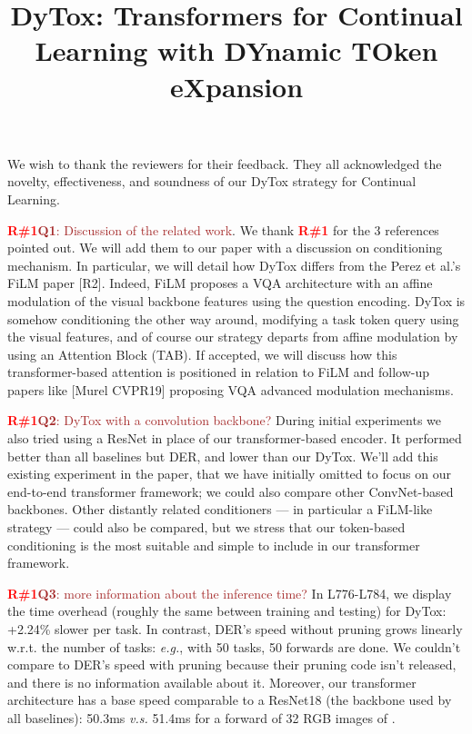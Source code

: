 \documentclass[rebuttal]{cvpr}
\newcommand{\rone}{\textcolor{red}{\textbf{R\#1}}\xspace}
\begin{document}
\title{DyTox: Transformers for Continual Learning with DYnamic TOken eXpansion}  

\maketitle
\thispagestyle{empty}


\noindent We wish to thank the reviewers for their feedback. They all acknowledged the novelty, effectiveness, and soundness of our DyTox strategy for Continual Learning.




\textcolor{brown}{\rone\textbf{Q1}: Discussion of the related work}. We thank \rone for the 3 references  pointed out. We will add them to our paper with a discussion on conditioning mechanism. 
In particular, we will detail how DyTox differs from the Perez et al.'s FiLM paper [R2]. Indeed, FiLM proposes a VQA architecture with an affine modulation of the visual backbone features using the question encoding. DyTox is somehow conditioning the other way around, modifying a task token query using the visual features, and of course our strategy departs from affine modulation by using an Attention Block (TAB). If accepted, we will discuss how this transformer-based attention is positioned in relation to FiLM and follow-up papers like [Murel CVPR19] proposing VQA advanced modulation mechanisms.  





\rone\textcolor{brown}{\textbf{Q2}: DyTox with a convolution backbone?} During initial experiments we also tried using a ResNet in place of our transformer-based encoder. It performed better than all baselines but DER, and lower than our DyTox.
We'll add this existing experiment in the paper, that we have initially omitted to focus on our end-to-end transformer framework; we could also compare other ConvNet-based backbones. Other distantly related conditioners --- in particular a FiLM-like strategy --- could also be compared, but we stress that our token-based conditioning is the most suitable and simple to include in our transformer framework.





\rone\textcolor{brown}{\textbf{Q3}: more information about the inference time?} In L776-L784, we display the time overhead (roughly the same between training and testing) for DyTox: +2.24\% slower per task. In contrast, DER's speed without pruning grows linearly w.r.t. the number of tasks: \textit{e.g.}, with 50 tasks, 50 forwards are done. We couldn't compare to DER's speed with pruning because their pruning code isn't released, and there is no information available about it.
Moreover, our transformer architecture has a base speed comparable to a ResNet18 (the backbone used by all baselines): 50.3ms \textit{v.s.} 51.4ms for a forward of 32 RGB images of .
\end{document}
